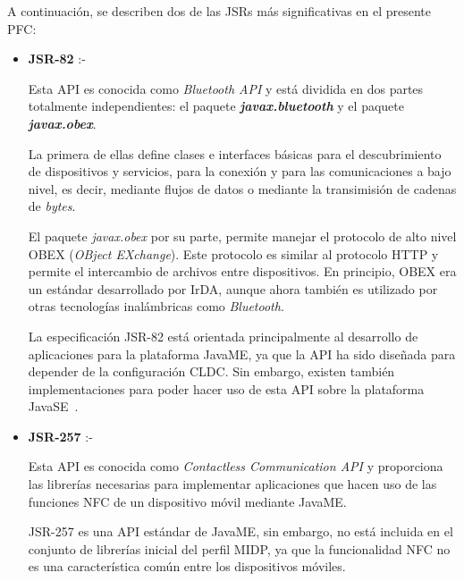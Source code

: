 A continuación, se describen dos de las \acs{JSR}s más significativas
en el presente \acs{PFC}:

\begin{itemize}
\item \textbf{\acs{JSR}-82} :- %

Esta \acs{API} es conocida como \emph{Bluetooth \acs{API}} y está dividida en
dos partes totalmente independientes: el paquete
\emph{\textbf{javax.bluetooth}} y el paquete \emph{\textbf{javax.obex}}.

La primera de ellas define clases e interfaces básicas para el descubrimiento
de dispositivos y servicios, para la conexión y para las comunicaciones a bajo 
nivel, es decir, mediante flujos de datos o mediante la transimisión de cadenas
de \emph{bytes}.

El paquete \emph{javax.obex} por su parte, permite manejar el protocolo de
alto nivel \acs{OBEX} (\emph{OBject EXchange}). Este protocolo es similar
al protocolo \acs{HTTP} y permite el intercambio de archivos entre
dispositivos. En principio, \acs{OBEX} era un estándar desarrollado por
\acs{IrDA}, aunque ahora también es utilizado por otras tecnologías
inalámbricas como \emph{Bluetooth}.

La especificación \acs{JSR}-82 está orientada principalmente al desarrollo
de aplicaciones para la plataforma \acs{JavaME}, ya que la \acs{API} ha sido
diseñada para depender de la configuración \acs{CLDC}. Sin embargo, existen
también implementaciones para poder hacer uso de esta \acs{API} sobre la
plataforma \acs{JavaSE}~\cite{bib:jsr82}.

\item \textbf{\acs{JSR}-257} :- %

Esta \acs{API} es conocida como \emph{Contactless Communication \acs{API}} y
proporciona las librerías necesarias para implementar aplicaciones que
hacen uso de las funciones \acs{NFC} de un dispositivo móvil mediante
\acs{JavaME}.

\acs{JSR}-257 es una \acs{API} estándar de \acs{JavaME}, sin embargo, no
está incluida en el conjunto de librerías inicial del perfil \acs{MIDP}, ya
que la funcionalidad \acs{NFC} no es una característica común entre los
dispositivos móviles.


\end{itemize}
